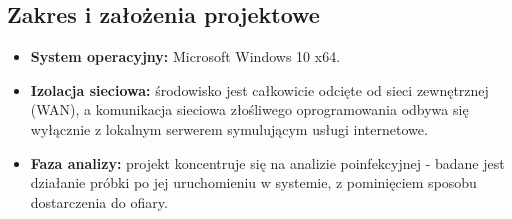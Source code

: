 \subsection*{Zakres i założenia projektowe}
\begin{itemize}
    \item \textbf{System operacyjny:} Microsoft Windows 10 x64.
    \item \textbf{Izolacja sieciowa:} środowisko jest całkowicie odcięte od sieci zewnętrznej (WAN), a komunikacja sieciowa złośliwego oprogramowania odbywa się wyłącznie z lokalnym serwerem symulującym usługi internetowe.
    \item \textbf{Faza analizy:} projekt koncentruje się na analizie poinfekcyjnej - badane jest działanie próbki po jej uruchomieniu w systemie, z pominięciem sposobu dostarczenia do ofiary.
\end{itemize}

